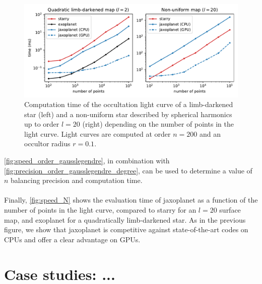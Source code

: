 \documentclass[modern]{aastex631}
\begin{document}
\begin{figure}[H]
    \begin{center}
        \includegraphics[width=\textwidth]{../workflows/speed/figures/speed_vs_N.pdf}
        \caption{Computation time of the occultation light curve of a limb-darkened star (left) and a non-uniform star described by spherical harmonics up to order $l=20$ (right) depending on the number of points in the light curve. Light curves are computed at order $n=200$ and an occultor radius $r=0.1$.}
        \label{fig:speed_N}
    \end{center}
\end{figure}
\autoref{fig:speed_order_gausslegendre}, in combination with \autoref{fig:precision_order_gausslegendre_degree}, can be used to determine a value of $n$ balancing precision and computation time.\\\\
Finally, \autoref{fig:speed_N} shows the evaluation time of \textsf{jaxoplanet} as a function of the number of points in the light curve, compared to \textsf{starry} for an $l=20$ surface map, and \textsf{exoplanet} for a quadratically limb-darkened star. As in the previous figure, we show that \textsf{jaxoplanet} is competitive against state-of-the-art codes on CPUs and offer a clear advantage on GPUs.



\section{Case studies: ...}

\subsection{}



\appendix
\end{document}
